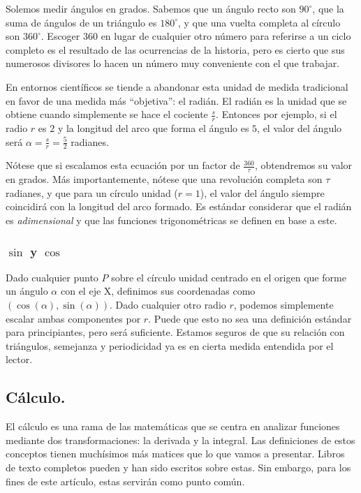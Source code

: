 Solemos medir ángulos en grados. Sabemos que un ángulo recto son $90^{\circ}$, que la suma de ángulos de un triángulo es $180^{\circ}$, y que una vuelta completa al círculo son $360^{\circ}$. Escoger 360 en lugar de cualquier otro número para referirse a un ciclo completo es el resultado de las ocurrencias de la historia, pero es cierto que sus numerosos divisores lo hacen un número muy conveniente con el que trabajar.

En entornos científicos se tiende a abandonar esta unidad de medida tradicional en favor de una medida más \enquote{objetiva}: el radián. El radián es la unidad que se obtiene cuando simplemente se hace el cociente $\frac{s}{r}$. Entonces por ejemplo, si el radio $r$ es $2$ y la longitud del arco que forma el ángulo es $5$, el valor del ángulo será $\alpha = \frac{s}{r} = \frac{5}{2}$ radianes.

Nótese que si escalamos esta ecuación por un factor de $\frac{360}{\tau}$, obtendremos su valor en grados. Más importantemente, nótese que una revolución completa son $\tau$ radianes, y que para un círculo unidad ($r = 1$), el valor del ángulo siempre coincidirá con la longitud del arco formado. Es estándar considerar que el radián es \textit{adimensional} y que las funciones trigonométricas se definen en base a este.

\newpage

\subsubsection{$\sin$ y $\cos$}

Dado cualquier punto $P$ sobre el círculo unidad centrado en el origen que forme un ángulo $\alpha$ con el eje X, definimos sus coordenadas como $(\cos(\alpha), \sin(\alpha))$. Dado cualquier otro radio $r$, podemos simplemente escalar ambas componentes por $r$. Puede que esto no sea una definición estándar para principiantes, pero será suficiente. Estamos seguros de que su relación con triángulos, semejanza y periodicidad ya es en cierta medida entendida por el lector.

\subsection{Cálculo.}

El cálculo es una rama de las matemáticas que se centra en analizar funciones mediante dos transformaciones: la derivada y la integral. Las definiciones de estos conceptos tienen muchísimos más matices que lo que vamos a presentar. Libros de texto completos pueden y han sido escritos sobre estas. Sin embargo, para los fines de este artículo, estas servirán como punto común.

